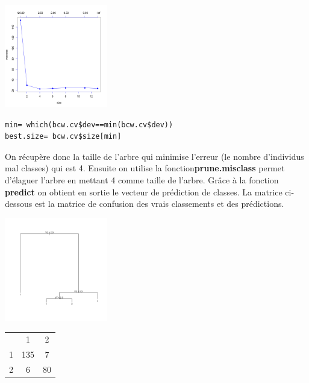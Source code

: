 \documentclass[10pt]{article}
\begin{document}
\begin{minipage}{.4\textwidth}
	\includegraphics[width=45mm]{Figures/bcw_cvplot.png}
\end{minipage}%
\hspace{0.01\linewidth}
\begin{minipage}{.65\textwidth}
 \begin{lstlisting}
min= which(bcw.cv$dev==min(bcw.cv$dev))
best.size= bcw.cv$size[min]
 \end{lstlisting}
\end{minipage}

On récupère donc la taille de l'arbre qui minimise l'erreur (le nombre d'individus mal classes) qui est 4. Ensuite on utilise la fonction\textbf{prune.misclass} permet d’élaguer l’arbre en mettant 4 comme taille de l'arbre. Grâce à la fonction \textbf{predict} on obtient en sortie le vecteur de prédiction de classes. La matrice ci-dessous est la matrice de confusion des vrais classements et des prédictions.
\begin{minipage}{.5\textwidth}
	\includegraphics[width=45mm]{Figures/bcw_prunedtree.png}
\end{minipage}%
\hspace{0.00\linewidth}
\begin{minipage}{.4\textwidth}
\begin{tabular}{c  c c}
  & 1  &  2 \\
1 & 135 &   7 \\
2 &  6&  80
\end{tabular}
\end{minipage}
\end{document}
